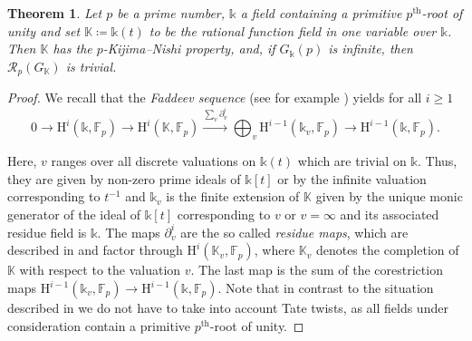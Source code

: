 \documentclass{amsart}
\newtheorem{thm}{Theorem}[section]
\theoremstyle{definition}
\theoremstyle{remark}
\newcommand{\KK}{\mathbb{K}}
\newcommand{\FF}{\mathbb{F}}
\newcommand{\calR}{\mathcal{R}}
\newcommand{\rmH}{\mathrm H}%
\begin{document}
\begin{thm}
\label{thm: rational function field trivial radical}
    Let $p$ be a prime number, $\mathbb{k}$ a field containing a primitive $p^{\mathrm{th}}$-root of unity and set $\KK\coloneq \mathbb{k}(t)$ to be the rational function field in one variable over $\mathbb{k}$. Then $\KK$ has the $p$-Kijima--Nishi property, and, if $G_{\mathbb{k}}(p)$ is infinite, then $\calR_p(G_\KK)$ is trivial.
\end{thm}
\begin{proof}
    We recall that the \emph{Faddeev sequence} (see for example \cite[Thm. 6.9.1 resp. Cor. 6.9.3]{GilleSzamuely}) yields for all $i\geq 1$
    \begin{equation*}
    0\to \rmH^i(\mathbb{k},\FF_p)\to \rmH^i(\KK,\FF_p)\overset{\sum_v\partial_v^i}\longrightarrow \bigoplus_v\rmH^{i-1}(\mathbb{k}_v,\FF_p)\to \rmH^{i-1}(\mathbb{k},\FF_p).
    \end{equation*}

    Here, $v$ ranges over all discrete valuations on $\mathbb{k}(t)$ which are trivial on $\mathbb{k}$. Thus, they are given by non-zero prime ideals of $\mathbb{k}[t]$ or by the infinite valuation corresponding to $t^{-1}$ and $\mathbb{k}_v$ is the finite extension of $\KK$ given by the unique monic generator of the ideal of $\mathbb{k}[t]$ corresponding to $v$ or $v=\infty$ and its associated residue field is $\mathbb{k}$. The maps $\partial^i_v$ are the so called \textit{residue maps}, which are described in \cite[Const. 6.8.5]{GilleSzamuely} and factor through $\rmH^i(\KK_v,\FF_p)$, where $\KK_v$ denotes the completion of $\KK$ with respect to the valuation $v$. The last map is the sum of the corestriction maps $\rmH^{i-1}(\mathbb{k}_v,\FF_p)\to \rmH^{i-1}(\mathbb{k},\FF_p)$. Note that in contrast to the situation described in \cite[\S 6.9]{GilleSzamuely} we do not have to take into account Tate twists, as all fields under consideration contain a primitive $p^{\mathrm{th}}$-root of unity.


\end{proof}
\end{document}
